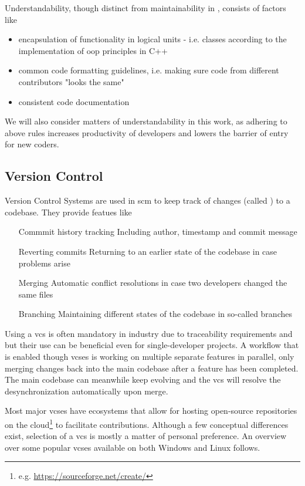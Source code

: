 Understandability, though distinct from maintainability in \citet{Bray1997}, consists of factors like 
\begin{itemize}
	\item encapsulation of functionality in logical units - i.e. classes according to the implementation of \gls{oop} principles in C++
	\item common code formatting guidelines, i.e. making sure code from different contributors "looks the same"
	\item consistent code documentation
\end{itemize}
We will also consider matters of understandability in this work, as adhering to above rules increases productivity of developers and lowers the barrier of entry for new coders.

\subsection{Version Control}
\gls{Version Control System}s  are used in \gls{scm} to keep track of changes (called ) to a codebase. They provide featues like
\begin{itemize}
	\item[Commmit history tracking] Including author, timestamp and commit message 
	\item[Reverting commits] Returning to an earlier state of the codebase in case problems arise
	\item[Merging] Automatic conflict resolutions in case two developers changed the same files
	\item[Branching] Maintaining different states of the codebase in so-called branches
\end{itemize}

Using a \gls{vcs} is often mandatory in industry due to traceability requirements and but their use can be beneficial even for single-developer projects. A workflow that is enabled though \gls{vcs}es is working on multiple separate features in parallel, only merging changes back into the main codebase after a feature has been completed. The main codebase can meanwhile keep evolving and the \gls{vcs} will resolve the desynchronization automatically upon merge.

Most major \gls{vcs}es have ecosystems that allow for hosting open-source repositories on the \gls{cloud}\footnote{e.g. \url{https://sourceforge.net/create/}} to facilitate contributions. Although a few conceptual differences exist, selection of a \gls{vcs} is mostly a matter of personal preference. 
An overview over some popular \gls{vcs}es available on both Windows and Linux follows.

